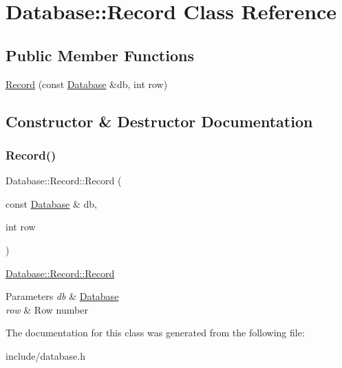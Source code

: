 \hypertarget{class_database_1_1_record}{}\section{Database\+:\+:Record Class Reference}
\label{class_database_1_1_record}
\subsection*{Public Member Functions}
\begin{DoxyCompactItemize}
\item 
\hyperlink{class_database_1_1_record_a913e37db1858bc8832c4c647c85268ac}{Record} (const \hyperlink{class_database}{Database} \&db, int row)
\end{DoxyCompactItemize}


\subsection{Constructor \& Destructor Documentation}
\mbox{\label{class_database_1_1_record_a913e37db1858bc8832c4c647c85268ac}} 
\subsubsection{\texorpdfstring{Record()}{Record()}}
{\footnotesize\ttfamily Database\+::\+Record\+::\+Record (\begin{DoxyParamCaption}\item[{const \hyperlink{class_database}{Database} \&}]{db,  }\item[{int}]{row }\end{DoxyParamCaption})}

\hyperlink{class_database_1_1_record_a913e37db1858bc8832c4c647c85268ac}{Database\+::\+Record\+::\+Record}


\begin{DoxyParams}{Parameters}
{\em db} & \hyperlink{class_database}{Database} \\
\hline
{\em row} & Row number \\
\hline
\end{DoxyParams}


The documentation for this class was generated from the following file\+:\begin{DoxyCompactItemize}
\item 
include/database.\+h\end{DoxyCompactItemize}
